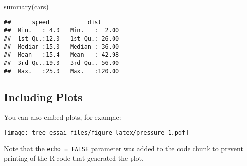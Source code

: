 \documentclass[
]{article}
\newenvironment{Shaded}{\begin{snugshade}}{\end{snugshade}}
\newcommand{\FunctionTok}[1]{\textcolor[rgb]{0.00,0.00,0.00}{#1}}
\newcommand{\NormalTok}[1]{#1}
\begin{document}
\begin{Shaded}
\begin{Highlighting}[]
\FunctionTok{summary}\NormalTok{(cars)}
\end{Highlighting}
\end{Shaded}

\begin{verbatim}
##      speed           dist       
##  Min.   : 4.0   Min.   :  2.00  
##  1st Qu.:12.0   1st Qu.: 26.00  
##  Median :15.0   Median : 36.00  
##  Mean   :15.4   Mean   : 42.98  
##  3rd Qu.:19.0   3rd Qu.: 56.00  
##  Max.   :25.0   Max.   :120.00
\end{verbatim}

\hypertarget{including-plots}{%
\subsection{Including Plots}\label{including-plots}}

You can also embed plots, for example:

\texttt{[image: tree\_essai\_files/figure-latex/pressure-1.pdf]}

Note that the \texttt{echo\ =\ FALSE} parameter was added to the code
chunk to prevent printing of the R code that generated the plot.
\end{document}
